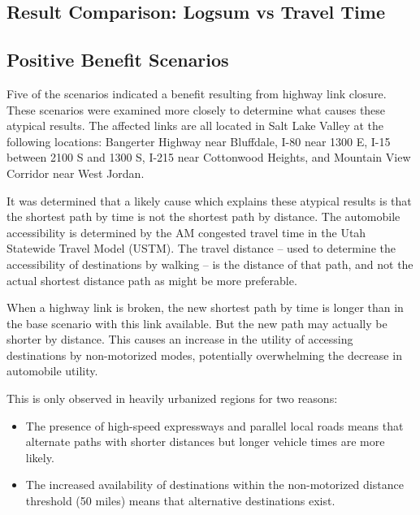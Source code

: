 \documentclass[3p, authoryear]{elsarticle} %
\begin{document}
\hypertarget{result-comparison-logsum-vs-travel-time}{%
\subsection{Result Comparison: Logsum vs Travel Time}\label{result-comparison-logsum-vs-travel-time}}

\hypertarget{positive-benefit-scenarios}{%
\subsection{Positive Benefit Scenarios}\label{positive-benefit-scenarios}}

Five of the scenarios indicated a benefit resulting from highway link closure.
These scenarios were examined more closely to determine what causes these
atypical results. The affected links are all located in Salt Lake Valley at the
following locations: Bangerter Highway near Bluffdale, I-80 near 1300 E, I-15
between 2100 S and 1300 S, I-215 near Cottonwood Heights, and Mountain View
Corridor near West Jordan.

It was determined that a likely cause which explains these atypical results is
that the shortest path by time is not the shortest path by distance. The
automobile accessibility is determined by the AM congested travel time in the
Utah Statewide Travel Model (USTM). The travel distance -- used to determine the
accessibility of destinations by walking -- is the distance of that path, and not
the actual shortest distance path as might be more preferable.

When a highway link is broken, the new shortest path by time is longer than in
the base scenario with this link available. But the new path may actually be
shorter by distance. This causes an increase in the utility of accessing
destinations by non-motorized modes, potentially overwhelming the decrease in
automobile utility.

This is only observed in heavily urbanized regions for two reasons:

\begin{itemize}
\item
  The presence of high-speed expressways and parallel local roads means that
  alternate paths with shorter distances but longer vehicle times are more likely.
\item
  The increased availability of destinations within the non-motorized distance
  threshold (50 miles) means that alternative destinations exist.
\end{itemize}
\end{document}
